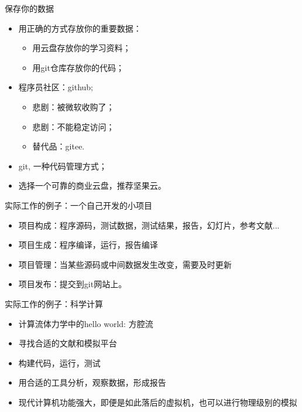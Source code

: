 \documentclass{beamer}
\begin{document}
\begin{frame}{保存你的数据}
  \begin{itemize}
  \item<1-> 用正确的方式存放你的重要数据：
    \begin{itemize}
    \item<1-> 用云盘存放你的学习资料；
    \item<1-> 用git仓库存放你的代码；
    \end{itemize}
  \item<2-> 程序员社区：github;
    \begin{itemize}
    \item<2-> 悲剧：被微软收购了；
    \item<2-> 悲剧：不能稳定访问；
    \item<2-> 替代品：gitee.
    \end{itemize}
  \item<3-> git, 一种代码管理方式；
  \item<4-> 选择一个可靠的商业云盘，推荐坚果云。
  \end{itemize}
\end{frame}

\begin{frame}{实际工作的例子：一个自己开发的小项目}
  \begin{itemize}
  \item<1-> 项目构成：程序源码，测试数据，测试结果，报告，幻灯片，参考文献...
  \item<2-> 项目生成：程序编译，运行，报告编译
  \item<3-> 项目管理：当某些源码或中间数据发生改变，需要及时更新
  \item<4-> 项目发布：提交到git网站上。
  \end{itemize}
\end{frame}

\begin{frame}{实际工作的例子：科学计算}
  \begin{itemize}
  \item<1-> 计算流体力学中的hello world: 方腔流
  \item<2-> 寻找合适的文献和模拟平台
  \item<3-> 构建代码，运行，测试
  \item<4-> 用合适的工具分析，观察数据，形成报告
  \item<5-> 现代计算机功能强大，即便是如此落后的虚拟机，也可以进行物理级别的模拟
  \end{itemize}
\end{frame}
\end{document}

